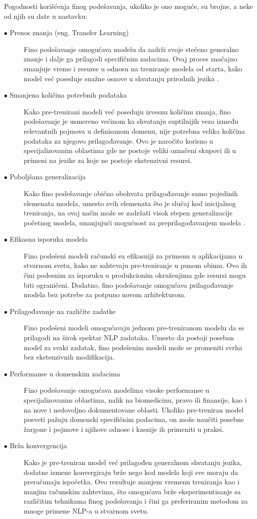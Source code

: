 \documentclass[12pt,oneside]{memoir}
\begin{document}
Pogodnosti korišćenja finog podešavanja, ukoliko je ono moguće, su brojne, a neke od njih su date u nastavku:

\begin{description}
	\item[$\bullet$ Prenos znanja (eng. Transfer Learning)] Fino podešavanje omogućava modelu da zadrži svoje stečeno generalno znanje i dalje ga prilagodi specifičnim zadacima. Ovaj proces značajno smanjuje vreme i resurse u odnosu na treniranje modela od starta, kako model već poseduje snažne osnove u shvatanju prirodnih jezika \cite{howard-ruder-2018-universal}. 
	\item[$\bullet$ Smanjena  količina potrebnih podataka] Kako pre-trenirani modeli već poseduju izvesnu količinu znanja, fino podešavanje je usmereno većinom ka shvatanju suptilnijih veza između relevantnih pojmova u definisanom domenu, nije potrebna velika količina podataka za njegovo prilagođavanje. Ovo je naročito korisno u specijalizovanim oblastima gde ne postoje veliki označeni skupovi ili u primeni na jezike za koje ne postoje ekstenzivni resursi\cite{peters-etal-2018-deep}.  
	\item[$\bullet$ Poboljšana generalizacija] Kako fino podešavanje obično obohvata prilagođavanje samo pojedinih elemenata modela, umesto svih elemenata što je slučaj kod inicijalnog treniranja, na ovaj način može se zadržati visok stepen generalizacije početnog modela, smanjujući mogućnost za preprilagođavanjem modela \cite{brown2020languagemodelsfewshotlearners}.	
	\item[$\bullet$ Efikasna isporuka modela] Fino podešeni modeli računski su efikasniji za primenu u aplikacijama u stvarnom svetu, kako ne zahtevaju pre-treniranje u punom obimu. Ovo ih čini podesnim za isporuku u produkcionim okruženjima gde resursi mogu biti ograničeni. Dodatno, fino podešavanje omogućava prilagođavanje modela bez potrebe za potpuno novom arhitekturom.
	\item[$\bullet$ Prilagođavanje na različite zadatke] Fino podešeni modeli omogućavaju jednom pre-treniranom modelu da se prilagodi na širok spektar NLP zadataka. Umesto da postoji poseban model za svaki zadatak, fino podešenim modeli može se promeniti svrha bez ekstenzivnih modifikacija.	
	\item[$\bullet$ Performanse u domenskim zadacima] Fino podešavanje omogućava modelima visoke performanse u specijalizovanim oblastima, nalik na biomedicinu, pravo ili finansije, kao i na nove i nedovoljno dokumentovane oblasti. Ukoliko pre-treniran model posveti pažnju domenski specifičnim podacima, on može naučiti posebne žargone i pojmove i njihove odnose i kasnije ih primeniti u praksi\cite{BioBERT}.
	\item[$\bullet$ Brža konvergencija] Kako je pre-treniran model već prilagođen generalnom shvatanju jezika, dodatne izmene konvergiraju brže nego kod modela koji sve moraju da preračunaju ispočetka. Ovo rezultuje manjem vremenu treniranja kao i manjim računskim zahtevima, što omogućava brže eksperimentisanje sa različitim tehnikama finog podešavanja i čini ga preferiranim metodom za mnoge primene NLP-a u stvarnom svetu.

\end{description}
\end{document}
